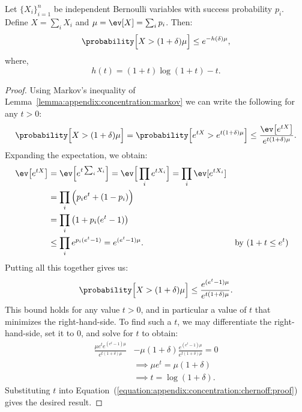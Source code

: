 \begin{lemma}
    Let $\{ X_i \}_{i=1}^n$ be independent Bernoulli variables with success probability $p_i$.
    Define $X = \sum_i X_i$ and $\mu = \ev[X] = \sum_i p_i$. Then:
    \begin{equation*}
        \probability \Big[ X > (1 + \delta) \mu \Big] \leq e^{-h(\delta) \mu},
    \end{equation*}
    where,
    \begin{equation*}
        h(t) = (1 + t) \log(1 + t) - t.
    \end{equation*}
\end{lemma}
\begin{proof}
    Using Markov's inequality of Lemma~\ref{lemma:appendix:concentration:markov}
    we can write the following for any $t > 0$:
    \begin{equation*}
        \probability\Big[ X > (1 + \delta)\mu \Big] =
            \probability\Big[ e^{tX} > e^{t(1 + \delta)\mu} \Big] \leq
            \frac{\ev\big[ e^{tX} \big]}{e^{t (1 + \delta) \mu}}.
    \end{equation*}
    Expanding the expectation, we obtain:
    \begin{align*}
        \ev\big[e^{tX}\big] &= \ev\Big[ e^{t \sum_i X_i} \Big] = \ev\Big[ \prod_i e^{tX_i} \Big]
        = \prod_i \ev[e^{tX_i}] \\
        &= \prod_i \Big( p_i e^t + (1 - p_i) \Big) \\
        &= \prod_i \big( 1 + p_i (e^t - 1) \big) \\
        &\leq \prod_i e^{p_i(e^t - 1)} = e^{(e^t - 1)\mu}. && \text{by $(1 + t \leq e^t)$} \\
    \end{align*}
    Putting all this together gives us:
    \begin{equation}
        \label{equation:appendix:concentration:chernoff:proof}
        \probability\Big[ X > (1 + \delta)\mu \Big] \leq 
        \frac{e^{(e^t - 1) \mu}}{e^{t (1 + \delta) \mu}}.
    \end{equation}
    This bound holds for any value $t > 0$, and in particular a value of $t$ that
    minimizes the right-hand-side. To find such a $t$, we may differentiate
    the right-hand-side, set it to $0$, and solve for $t$ to obtain:
    \begin{align*}
        \frac{\mu e^t e^{(e^t - 1) \mu}}{e^{t (1 + \delta) \mu}} &-
        \mu ( 1 + \delta ) \frac{e^{(e^t - 1) \mu}}{e^{t (1 + \delta) \mu}} = 0 \\
        &\implies \mu e^t = \mu (1 + \delta) \\
        &\implies t = \log(1 + \delta).
    \end{align*}
    Substituting $t$ into Equation~(\ref{equation:appendix:concentration:chernoff:proof})
    gives the desired result.
\end{proof}

